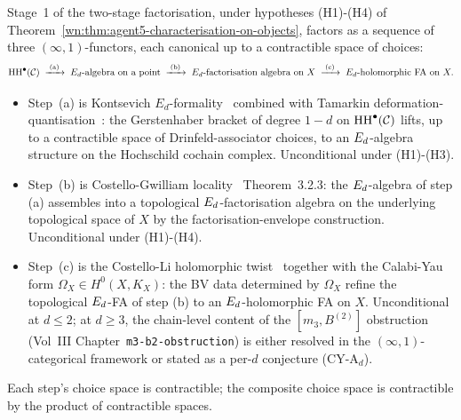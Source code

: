 \begin{proposition}
\ClaimStatusTheorem\label{wn:prop:agent5-stage1-three-step}
Stage~1 of the two-stage factorisation, under hypotheses (H1)-(H4) of
Theorem~\ref{wn:thm:agent5-characterisation-on-objects}, factors as a
sequence of three $(\infty,1)$-functors, each canonical up to a
contractible space of choices:
\[
  \mathrm{HH}^\bullet(\mathcal{C})
  \;\xrightarrow{\;\mathrm{(a)}\;}\;
  \text{$E_d$-algebra on a point}
  \;\xrightarrow{\;\mathrm{(b)}\;}\;
  E_d\text{-factorisation algebra on } X
  \;\xrightarrow{\;\mathrm{(c)}\;}\;
  E_d\text{-holomorphic FA on } X.
\]
\begin{itemize}
\item Step~\textup{(a)} is Kontsevich $E_d$-formality~\cite{Kontsevich1999}
combined with Tamarkin deformation-quantisation~\cite{Tamarkin2007}: the
Gerstenhaber bracket of degree $1 - d$ on $\mathrm{HH}^\bullet(\mathcal{C})$ lifts,
up to a contractible space of Drinfeld-associator choices, to an
$E_d$-algebra structure on the Hochschild cochain complex.
Unconditional under (H1)-(H3).
\item Step~\textup{(b)} is Costello-Gwilliam locality~\cite{CostelloGwilliam2017}
Theorem~3.2.3: the $E_d$-algebra of step (a) assembles into a
topological $E_d$-factorisation algebra on the underlying topological
space of $X$ by the factorisation-envelope construction. Unconditional
under (H1)-(H4).
\item Step~\textup{(c)} is the Costello-Li holomorphic twist~\cite{CostelloLi2016,CostelloLi2020}
together with the Calabi-Yau form $\Omega_X \in H^0(X, K_X)$: the BV
data determined by $\Omega_X$ refine the topological $E_d$-FA of
step (b) to an $E_d$-holomorphic FA on $X$. Unconditional at $d \le 2$;
at $d \ge 3$, the chain-level content of the $[m_3, B^{(2)}]$
obstruction (Vol~III Chapter~\texttt{m3-b2-obstruction}) is either
resolved in the $(\infty,1)$-categorical framework or stated as a
per-$d$ conjecture (CY-A$_d$).
\end{itemize}
Each step's choice space is contractible; the composite choice space
is contractible by the product of contractible spaces.
\end{proposition}

